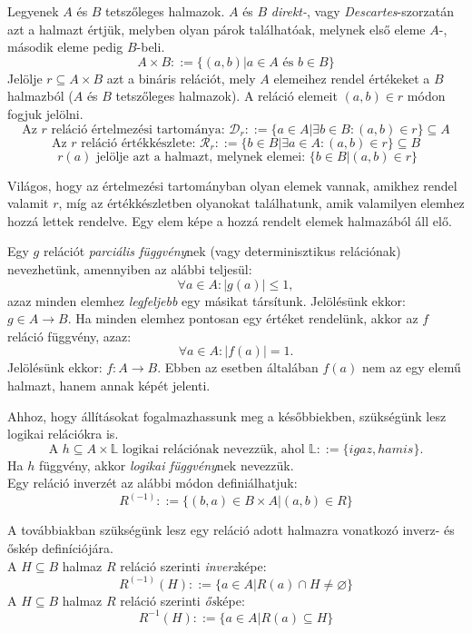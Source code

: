 \documentclass[12pt]{article}
\begin{document}
Legyenek $A$ és $B$ tetszőleges halmazok. $A$ és $B$ \textit{direkt-}, vagy \textit{Descartes}-szorzatán azt a halmazt értjük, melyben olyan párok találhatóak, melynek első eleme $A$-, második eleme pedig $B$-beli.
$$A \times B ::= \{ (a,b) | a \in A \text{ és } b \in B \}$$
Jelölje $r \subseteq A \times B$ azt a bináris relációt, mely $A$ elemeihez rendel értékeket a $B$ halmazból ($A$ és $B$ tetszőleges halmazok). A reláció elemeit $(a,b) \in r $ módon fogjuk jelölni.
$$ \text{Az } r \text{ reláció értelmezési tartománya: } \mathcal{D}_r ::= \{a \in A | \exists b \in B: (a,b) \in r \} \subseteq A$$
$$ \text{Az } r \text{ reláció értékkészlete: } \mathcal{R}_r ::= \{b \in B | \exists a \in A: (a,b) \in r \} \subseteq B$$
$$\ r(a) \text{ jelölje azt a halmazt, melynek elemei: } \{b \in B | (a,b) \in r \} $$

Világos, hogy az értelmezési tartományban olyan elemek vannak, amikhez rendel valamit $r$, míg az értékkészletben olyanokat találhatunk, amik valamilyen elemhez hozzá lettek rendelve. Egy elem képe a hozzá rendelt elemek halmazából áll elő.

Egy $g$ relációt \textit{parciális függvény}nek (vagy determinisztikus relációnak) nevezhetünk, amennyiben az alábbi teljesül:
$$\forall a \in A : |g(a)| \le 1,$$ azaz minden elemhez \textit{legfeljebb} egy másikat társítunk.
Jelölésünk ekkor: $g \in A \rightarrow B$.
Ha minden elemhez pontosan egy értéket rendelünk, akkor az $f$ reláció függvény, azaz:
$$\forall a \in A : |f(a)| = 1. $$
Jelölésünk ekkor: $ f: A \rightarrow B $. Ebben az esetben általában $f(a)$ nem az egy elemű halmazt, hanem annak képét jelenti.

Ahhoz, hogy állításokat fogalmazhassunk meg a későbbiekben, szükségünk lesz logikai relációkra is.
$$\text{A } h \subseteq A \times \mathbb{L} \text{ logikai relációnak nevezzük, ahol } \mathbb{L} ::= \{igaz, hamis\}.$$
Ha $h$ függvény, akkor \textit{logikai függvény}nek nevezzük.\\
Egy reláció inverzét az alábbi módon definiálhatjuk:
$$R^{(-1)} ::= \{(b,a) \in B \times A | (a,b) \in R  \}$$

A továbbiakban szükségünk lesz egy reláció adott halmazra vonatkozó inverz- és őskép definíciójára.\\
A $H \subseteq B $ halmaz $R$ reláció szerinti \textit{inverz}képe:
$$ R^{(-1)}(H) ::= \{ a \in A | R(a) \cap H \ne \varnothing \}$$
A $H \subseteq B $ halmaz $R$ reláció szerinti \textit{ős}képe:
$$ R^{-1}(H) ::= \{ a \in A | R(a) \subseteq H \}$$
\end{document}
